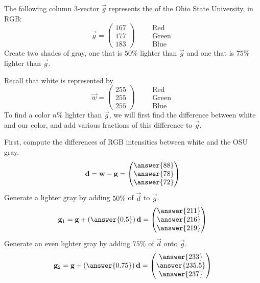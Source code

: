 \documentclass{ximera}
\author{Tae Eun Kim}
\begin{document}
\begin{exercise}
  The following column $3$-vector $\vec{g}$ represents the
  of the Ohio State University, in RGB:
  \[
    \vec{g} = \begin{pmatrix}
      167\\ 177\\ 183
    \end{pmatrix}
    \qquad
    \begin{array}{l}
      \text{Red}\\
      \text{Green}\\
      \text{Blue}
    \end{array}
    \]
    Create two shades of gray, one that is $50\%$ lighter than
    $\vec{g}$ and one that is $75\%$ lighter than $\vec{g}$.
    \begin{prompt}
      Recall that white is represented by
      \[
      \vec{w} = \begin{pmatrix}
        255\\ 255\\ 255
      \end{pmatrix}
      \qquad
      \begin{array}{l}
        \text{Red}\\
        \text{Green}\\
        \text{Blue}
      \end{array}
      \]
      To find a color $n\%$ lighter than $\vec{g}$, we will first find
      the difference between white and our color, and add various
      fractions of this difference to $\vec{g}$.

      First, compute the differences of RGB intensities between white
      and the OSU gray.
      \[
      \vec{d} = \vec{w} - \vec{g} =
      \begin{pmatrix}
        \answer{88}\\
        \answer{78}\\
        \answer{72}
      \end{pmatrix}
      \]
      Generate a lighter gray by adding $50\%$ of $\vec{d}$ to
      $\vec{g}$.
      \[
      \vec{g}_1 = \vec{g} + \left(\answer{0.5}\right)\vec{d} =
      \begin{pmatrix}
        \answer{211}\\
        \answer{216}\\
        \answer{219}
      \end{pmatrix}
      \]
      Generate an even lighter gray by adding $75\%$ of $\vec{d}$
      onto $\vec{g}$.
      \[
        \vec{g}_2 = \vec{g} + \left(\answer{0.75}\right)\vec{d} =
        \begin{pmatrix}
          \answer{233}\\
          \answer{235.5}\\
          \answer{237}
        \end{pmatrix}
      \]


\end{prompt}
\end{exercise}
\end{document}
